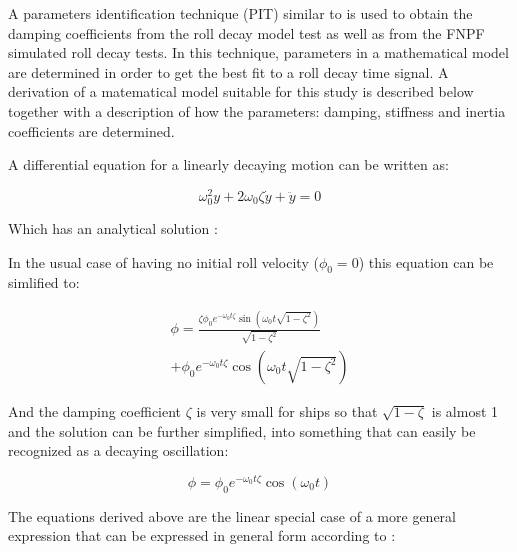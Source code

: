     A parameters identification technique (PIT) similar to
\cite{7505983/EXYJELCU} is used to obtain the damping coefficients from
the roll decay model test as well as from the FNPF simulated roll decay
tests. In this technique, parameters in a mathematical model are
determined in order to get the best fit to a roll decay time signal. A
derivation of a matematical model suitable for this study is described
below together with a description of how the parameters: damping,
stiffness and inertia coefficients are determined.

A differential equation for a linearly decaying motion can be written
as:
 
            
    
    \begin{equation}
\omega_{0}^{2} y + 2 \omega_{0} \zeta \dot{y} + \ddot{y} = 0
\label{eq:equation}
\end{equation}

    

    Which has an analytical solution \cite{undefined}:

    In the usual case of having no initial roll velocity ($\phi_0=0$) this
equation can be simlified to:
 
            
    
    \begin{equation}
\begin{aligned}
\phi = \frac{\zeta \phi_{0} e^{- \omega_{0} t \zeta} \operatorname{sin}\left(\omega_{0} t \sqrt{1 - \zeta^{2}}\right)}{\sqrt{1 - \zeta^{2}}} \\ + \phi_{0} e^{- \omega_{0} t \zeta} \operatorname{cos}\left(\omega_{0} t \sqrt{1 - \zeta^{2}}\right)
\end{aligned}
\label{eq:equation}
\end{equation}

    

    And the damping coefficient $\zeta$ is very small for ships so that
$\sqrt{1-\zeta}$ is almost 1 and the solution can be further
simplified, into something that can easily be recognized as a decaying
oscillation:
 
            
    
    \begin{equation}
\phi = \phi_{0} e^{- \omega_{0} t \zeta} \operatorname{cos}\left(\omega_{0} t\right)
\label{eq:equation}
\end{equation}

    

    The equations derived above are the linear special case of a more
general expression that can be expressed in general form according to
\cite{7505983/FB64RGPF}:
 
